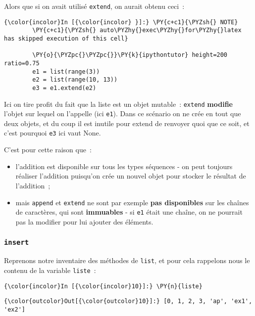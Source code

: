     Alors que si on avait utilisé \texttt{extend}, on aurait obtenu ceci~:

    \begin{Verbatim}[commandchars=\\\{\}]
{\color{incolor}In [{\color{incolor} }]:} \PY{c+c1}{\PYZsh{} NOTE}
        \PY{c+c1}{\PYZsh{} auto\PYZhy{}exec\PYZhy{}for\PYZhy{}latex has skipped execution of this cell}
        
        \PY{o}{\PYZpc{}\PYZpc{}}\PY{k}{ipythontutor} height=200 ratio=0.75
        e1 = list(range(3))
        e2 = list(range(10, 13))
        e3 = e1.extend(e2)
\end{Verbatim}


    Ici on tire profit du fait que la liste est un objet mutable~:
\texttt{extend} \textbf{modifie} l'objet sur lequel on l'appelle (ici
\texttt{e1}). Dans ce scénario on ne crée en tout que deux objets, et du
coup il est inutile pour extend de renvoyer quoi que ce soit, et c'est
pourquoi \texttt{e3} ici vaut None.

    C'est pour cette raison que~:

\begin{itemize}
\tightlist
\item
  l'addition est disponible sur tous les types séquences - on peut
  toujours réaliser l'addition puisqu'on crée un nouvel objet pour
  stocker le résultat de l'addition~;
\item
  mais \texttt{append} et \texttt{extend} ne sont par exemple
  \textbf{pas disponibles} sur les chaînes de caractères, qui sont
  \textbf{immuables} - si \texttt{e1} était une chaîne, on ne pourrait
  pas la modifier pour lui ajouter des éléments.
\end{itemize}

    \hypertarget{insert}{%
\subsubsection{\texorpdfstring{\texttt{insert}}{insert}}\label{insert}}

    Reprenons notre inventaire des méthodes de \texttt{list}, et pour cela
rappelons nous le contenu de la variable \texttt{liste}~:

    \begin{Verbatim}[commandchars=\\\{\}]
{\color{incolor}In [{\color{incolor}10}]:} \PY{n}{liste}
\end{Verbatim}


\begin{Verbatim}[commandchars=\\\{\}]
{\color{outcolor}Out[{\color{outcolor}10}]:} [0, 1, 2, 3, 'ap', 'ex1', 'ex2']
\end{Verbatim}
            
